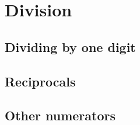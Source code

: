 \chapter{Division}

\section{Dividing by one digit}
\lesson
{}

\section{Reciprocals}
\lesson
{}

\section{Other numerators}
\lesson
{}
